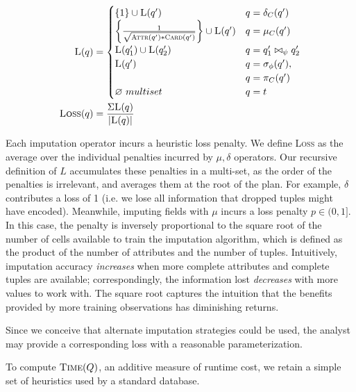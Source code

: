 \begin{align*}
  \textsc{L}(q) &= \begin{cases}
     \{1\} \cup \textsc{L}(q') & q = \delta_C(q') \\
    \left\{\frac{1}{\sqrt{ \textsc{Attr}(q') * \textsc{Card}(q')}}\right\} \cup \textsc{L}(q')  & q = \mu_C(q') \\
    \textsc{L}(q_1') \cup \textsc{L}(q_2') & q = q_1' \bowtie_\psi q_2' \\
    \textsc{L}(q') & q = \sigma_\phi(q'), \\ & q = \pi_C(q') \\
    \emptyset\ multiset & q = t\\
  \end{cases}\\
  \textsc{Loss}(q) &= \frac{\Sigma \textsc{L}(q)}{|\textsc{L}(q)|}
\end{align*}

Each imputation operator incurs a heuristic loss penalty. We define \textsc{Loss} as the average over the individual penalties incurred
by $\mu,\delta$ operators. Our recursive definition of $L$ accumulates these penalties in a multi-set, as the order of the penalties is irrelevant,
and averages them at the root of the plan. For example, $\delta$ contributes a loss of 1 (i.e. we lose all information  that dropped tuples
might have encoded). Meanwhile, imputing \nullv{} fields with $\mu$ incurs a loss penalty $p \in (0, 1]$. In this case, the penalty is
inversely proportional to the square root of the number of cells available to train the imputation algorithm, which is defined as
the product of the number of attributes and the number of tuples. Intuitively, imputation
accuracy \textit{increases} when more complete attributes and complete tuples are available;
correspondingly, the information lost \textit{decreases} with more values to work
with. The square root captures the intuition that the benefits provided by more training observations has diminishing returns.

Since we conceive that
alternate imputation strategies could be used, the analyst may provide a corresponding
loss with a reasonable parameterization.

To compute $\textsc{Time}(Q)$, an additive measure of runtime cost, we retain a simple set of heuristics used by a standard 
database. 

